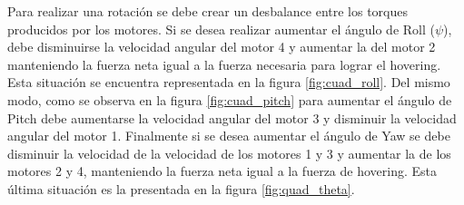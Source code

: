 \documentclass[main]{subfiles}
\begin{document}
\begin{figure}
\centering
{}
\caption{}
\end{figure}

Para realizar una rotaci\'on se debe crear un desbalance entre los torques producidos por los motores. Si se desea realizar aumentar el \'angulo de Roll ($\psi$), debe disminuirse la velocidad  angular del motor 4 y aumentar la del motor 2 manteniendo la fuerza neta igual a la fuerza necesaria para lograr el hovering. Esta situaci\'on se encuentra representada en la figura \ref{fig:cuad_roll}. Del mismo modo, como se observa en la figura \ref{fig:cuad_pitch} para aumentar el \'angulo de Pitch debe aumentarse la velocidad angular del motor 3 y disminuir la velocidad angular del motor 1. Finalmente si se desea aumentar el \'angulo de Yaw se debe disminuir la velocidad de la velocidad de los motores 1 y 3 y aumentar la de los motores 2 y 4, manteniendo la fuerza neta igual a la fuerza de hovering. Esta \'ultima situaci\'on es la presentada en la figura \ref{fig:quad_theta}.
\end{document}
